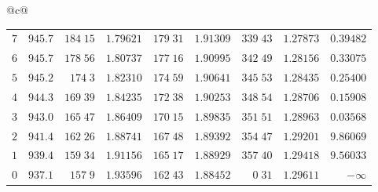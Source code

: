 \begin{center}
{\begin{tabular}{@{}c@{}}
\begin{tabular}{r|r|r|r|r|r|r|r|r}
$7$&$945.7$&$184\;15$&$1.79621$&$179\;31$&$1.91309$&$339\;43$&$1.27873$&$0.39482$\\
$6$&$945.7$&$178\;56$&$1.80737$&$177\;16$&$1.90995$&$342\;49$&$1.28156$&$0.33075$\\[2pt]
$5$&$945.2$&$174\;3$&$1.82310$&$174\;59$&$1.90641$&$345\;53$&$1.28435$&$0.25400$\\
$4$&$944.3$&$169\;39$&$1.84235$&$172\;38$&$1.90253$&$348\;54$&$1.28706$&$0.15908$\\
$3$&$943.0$&$165\;47$&$1.86409$&$170\;15$&$1.89835$&$351\;51$&$1.28963$&$0.03568$\\
$2$&$941.4$&$162\;26$&$1.88741$&$167\;48$&$1.89392$&$354\;47$&$1.29201$&$9.86069$\\
$1$&$939.4$&$159\;34$&$1.91156$&$165\;17$&$1.88929$&$357\;40$&$1.29418$&$9.56033$\\[2pt]
$0$&$937.1$&$157\;9$&$1.93596$&$162\;43$&$1.88452$&$0\;31$&$1.29611$&$-\infty$\\
\end{tabular}
\end{tabular}%
}
\end{center}
\endgroup
\clearpage
{}
\begingroup
\fontsize{9}{10.2}\selectfont
\setlength{\tabcolsep}{1.5pt}
\renewcommand{\arraystretch}{1.02}
